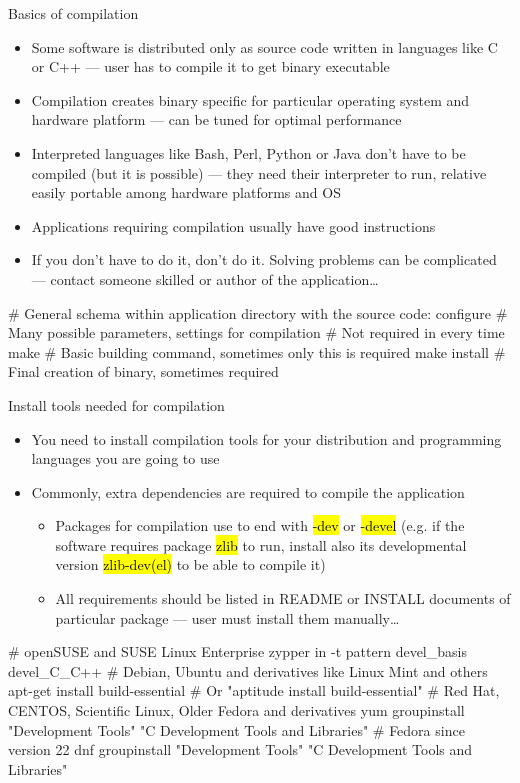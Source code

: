 \documentclass[compress, ucs, xelatex, 11pt, xcolor=svgnames,
  hyperref={
    bookmarks=true,
    unicode=true,
    colorlinks=true,
    pdftitle={Linux, command line and MetaCentrum},
    plainpages=false,
    pdfauthor={Vojtech Zeisek},
    pdfsubject={Course about use of Linux command line, writing shell scripts and using MetaCentrum of CESNET},
    pdfcreator={XeLaTeX},
    pdfkeywords={Linux, GNU, BASH, shell, command line, MetaCentrum},
    linkcolor=DarkRed,
    anchorcolor=DarkBlue,
    citecolor=Indigo,
    filecolor=NavyBlue,
    menucolor=DarkMagenta,
    urlcolor=DarkBlue,
    pdftex},
  url={hyphens, lowtilde} %
  ]{beamer}
\renewcommand{\texttt}[1]{\hl{\ttfamily #1}}
\begin{document}
\begin{frame}[fragile]{Basics of compilation}
  \begin{itemize}
    \item Some software is distributed only as source code written in languages like C or C++ --- user has to compile it to get binary executable
    \item Compilation creates binary specific for particular operating system and hardware platform --- can be tuned for optimal performance
    \item Interpreted languages like Bash, Perl, Python or Java don't have to be compiled (but it is possible) --- they need their interpreter to run, relative easily portable among hardware platforms and OS
    \item Applications requiring compilation usually have good instructions
    \item If you don't have to do it, don't do it. Solving problems can be complicated --- contact someone skilled or author of the application\ldots
  \end{itemize}
  \begin{bashcode}
    # General schema within application directory with the source code:
    configure # Many possible parameters, settings for compilation
              # Not required in every time
    make # Basic building command, sometimes only this is required
    make install # Final creation of binary, sometimes required
  \end{bashcode}
\end{frame}

\begin{frame}[fragile]{Install tools needed for compilation}
  \begin{itemize}
    \item You need to install compilation tools for your distribution and programming languages you are going to use
    \item Commonly, extra dependencies are required to compile the application
    \begin{itemize}
      \item Packages for compilation use to end with \texttt{-dev} or \texttt{-devel} (e.g. if the software requires package \texttt{zlib} to run, install also its developmental version \texttt{zlib-dev(el)} to be able to compile it)
      \item All requirements should be listed in README or INSTALL documents of particular package --- user must install them manually\ldots
    \end{itemize}
  \end{itemize}
  \begin{bashcode}
    # openSUSE and SUSE Linux Enterprise
    zypper in -t pattern devel_basis devel_C_C++
    # Debian, Ubuntu and derivatives like Linux Mint and others
    apt-get install build-essential # Or "aptitude install build-essential"
    # Red Hat, CENTOS, Scientific Linux, Older Fedora and derivatives
    yum groupinstall "Development Tools" "C Development Tools and Libraries"
    # Fedora since version 22
    dnf groupinstall "Development Tools" "C Development Tools and Libraries"
  \end{bashcode}
\end{frame}
\end{document}
